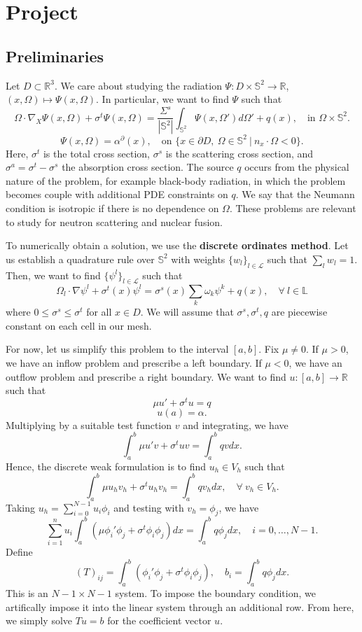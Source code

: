 \documentclass{article}
\theoremstyle{definition}
\theoremstyle{definition}
\newcommand{\R}{\mathbb{R}}
\begin{document}
\section{Project}
\subsection{Preliminaries}
Let $D\subset \R^3$. We care about studying the radiation $\Psi:D\times \mathbb{S}^2\to \R$, $(x,\Omega)\mapsto \Psi(x,\Omega)$. In particular, we want to find $\Psi$ such that
$$\Omega\cdot \nabla_{X}\Psi(x,\Omega)+\sigma^t\Psi(x,\Omega)=\frac{\Sigma^s}{|\mathbb{S}^2|}\int_{\mathbb{S}^2}\Psi(x,\Omega')d\Omega'+q(x),\quad \text{in }\Omega\times \mathbb{S}^2.$$
$$\Psi(x,\Omega)=\alpha^{\partial}(x),\quad \text{on }\{x\in \partial D,\:\Omega\in \mathbb{S}^2\:|\:n_{x}\cdot \Omega<0\}.$$
Here, $\sigma^t$ is the total cross section, $\sigma^s$ is the scattering cross section, and $\sigma^a=\sigma^t-\sigma^s$ the absorption cross section. The source $q$ occurs from the physical nature of the problem, for example black-body radiation, in which the problem becomes couple with additional PDE constraints on $q$. We say that the Neumann condition is isotropic if there is no dependence on $\Omega$. These problems are relevant to study for neutron scattering and nuclear fusion.

To numerically obtain a solution, we use the \textbf{discrete ordinates method}. Let us establish a quadrature rule over $\mathbb{S}^2$ with weights $\{w_{l}\}_{l\in \mathcal{L}}$ such that $\sum_{l}w_l=1$. Then, we want to find $\{\psi^l\}_{l\in \mathcal{L}}$ such that
$$\Omega_{l}\cdot \nabla \psi^{l}+\sigma^t(x)\psi^{l}=\sigma^{s}(x)\sum_{k}\omega_k\psi^{k}+q(x),\quad \forall\:l\in \mathbb{L}$$
where $0\leq \sigma^s\leq \sigma^t$ for all $x\in D$. We will assume that $\sigma^s,\sigma^t,q$ are piecewise constant on each cell in our mesh.

For now, let us simplify this problem to the interval $[a,b]$. Fix $\mu\neq 0$. If $\mu>0$, we have an inflow problem and prescribe a left boundary. If $\mu<0$, we have an outflow problem and prescribe a right boundary. We want to find $u:[a,b]\to \R$ such that
$$\mu u'+\sigma^tu=q$$
$$u(a)=\alpha.$$
Multiplying by a suitable test function $v$ and integrating, we have
$$\int_{a}^{b}\mu u'v+\sigma^tuv=\int_{a}^{b}qvdx.$$
Hence, the discrete weak formulation is to find $u_h\in V_h$ such that
$$\int_{a}^{b}\mu u_hv_h+\sigma^tu_hv_h=\int_{a}^{b}qv_hdx,\quad \forall\:v_h\in V_h.$$
Taking $u_h=\sum_{i=0}^{N-1}u_i\phi_i$ and testing with $v_h=\phi_j$, we have
$$\sum_{i=1}^{n}u_i\int_{a}^{b}(\mu\phi_i'\phi_j+\sigma^t\phi_i\phi_j)dx=\int_{a}^{b}q\phi_jdx,\quad i=0,\ldots,N-1.$$
Define
$$(T)_{ij}=\int_{a}^{b}(\phi_i'\phi_j+\sigma^t\phi_i\phi_j),\quad b_i=\int_{a}^{b}q\phi_jdx.$$
This is an $N-1\times N-1$ system. To impose the boundary condition, we artifically impose it into the linear system through an additional row. From here, we simply solve $Tu=b$ for the coefficient vector $u$.
\end{document}
